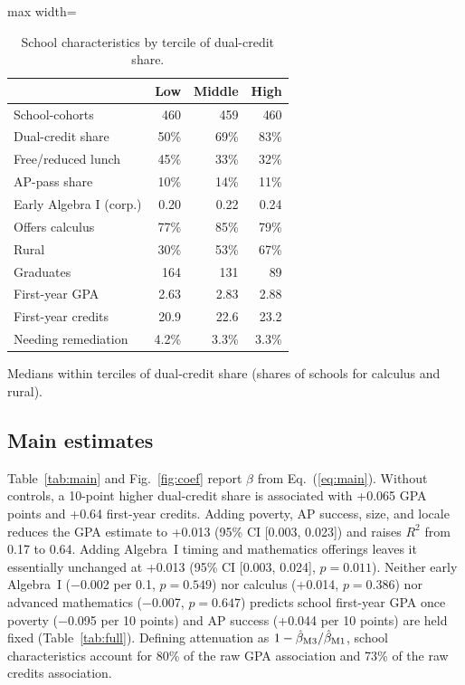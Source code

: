 \documentclass[aps,prd,reprint,superscriptaddress,nofootinbib,floatfix]{revtex4-2}
\begin{document}
\begin{table}[t]
\caption{School characteristics by tercile of dual-credit share.}
\label{tab:terc}
\footnotesize
\begin{adjustbox}{max width=\linewidth}
\begin{tabular}{lrrr}
\hline\hline
 & Low & Middle & High \\
\hline
School-cohorts & 460 & 459 & 460 \\
Dual-credit share & 50\% & 69\% & 83\% \\
Free/reduced lunch & 45\% & 33\% & 32\% \\
AP-pass share & 10\% & 14\% & 11\% \\
Early Algebra I (corp.) & 0.20 & 0.22 & 0.24 \\
Offers calculus & 77\% & 85\% & 79\% \\
Rural & 30\% & 53\% & 67\% \\
Graduates & 164 & 131 & 89 \\
First-year GPA & 2.63 & 2.83 & 2.88 \\
First-year credits & 20.9 & 22.6 & 23.2 \\
Needing remediation & 4.2\% & 3.3\% & 3.3\% \\
\hline\hline
\end{tabular}
\end{adjustbox}
\par\smallskip\parbox{0.98\linewidth}{\scriptsize Medians within terciles of dual-credit share (shares of schools for calculus and rural).}
\end{table}

\subsection{Main estimates}

Table~\ref{tab:main} and Fig.~\ref{fig:coef} report $\hat\beta$ from Eq.~(\ref{eq:main}). Without controls, a 10-point higher dual-credit share is associated with +0.065 GPA points and +0.64 first-year credits. Adding poverty, AP success, size, and locale reduces the GPA estimate to +0.013 (95\% CI [0.003, 0.023]) and raises $R^2$ from 0.17 to 0.64. Adding Algebra~I timing and mathematics offerings leaves it essentially unchanged at +0.013 (95\% CI [0.003, 0.024], $p=0.011$). Neither early Algebra~I ($-$0.002 per 0.1, $p=0.549$) nor calculus (+0.014, $p=0.386$) nor advanced mathematics ($-$0.007, $p=0.647$) predicts school first-year GPA once poverty ($-$0.095 per 10 points) and AP success (+0.044 per 10 points) are held fixed (Table~\ref{tab:full}). Defining attenuation as $1-\hat\beta_{\rm M3}/\hat\beta_{\rm M1}$, school characteristics account for 80\% of the raw GPA association and 73\% of the raw credits association.
\end{document}
